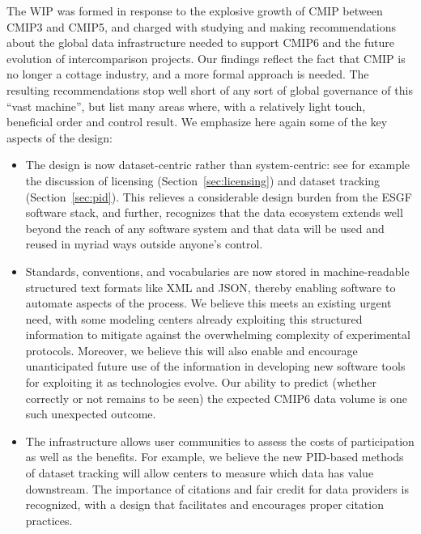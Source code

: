 \documentclass[gmd,manuscript]{copernicus}
\begin{document}
\label{sec:summary}

The WIP was formed in response to the explosive growth of CMIP between
CMIP3 and CMIP5, and charged with studying and making recommendations
about the global data infrastructure needed to support CMIP6 and the
future evolution of intercomparison projects. Our findings reflect 
the fact that CMIP is no longer a cottage industry, and a more formal 
approach is needed. The resulting recommendations stop well short of 
any sort of global governance of this ``vast machine'', but list many 
areas where, with a relatively light touch, beneficial order and 
control result. We emphasize here again some of the key aspects of 
the design:

\begin{itemize}
\item The design is now dataset-centric rather than system-centric:
  see for example the discussion of licensing
  (Section~\ref{sec:licensing}) and dataset tracking
  (Section~\ref{sec:pid}). This relieves a considerable design burden
  from the ESGF software stack, and further, recognizes that the data
  ecosystem extends well beyond the reach of any software system and
  that data will be used and reused in myriad ways outside anyone's
  control.
\item Standards, conventions, and vocabularies are now stored in
  machine-readable structured text formats like XML and JSON, thereby
  enabling software to automate aspects of the process. We believe
  this meets an existing urgent need, with some modeling centers
  already exploiting this structured information to mitigate against
  the overwhelming complexity of experimental protocols. Moreover, we
  believe this will also enable and encourage unanticipated future use
  of the information in developing new software tools for exploiting
  it as technologies evolve. Our ability to predict (whether correctly
  or not remains to be seen) the expected CMIP6 data volume is one
  such unexpected outcome.
\item The infrastructure allows user communities to assess the costs
  of participation as well as the benefits. For example, we believe
  the new PID-based methods of dataset tracking will allow centers to
  measure which data has value downstream. The importance of citations
  and fair credit for data providers is recognized, with a design that
  facilitates and encourages proper citation practices.
\end{itemize}
\end{document}
